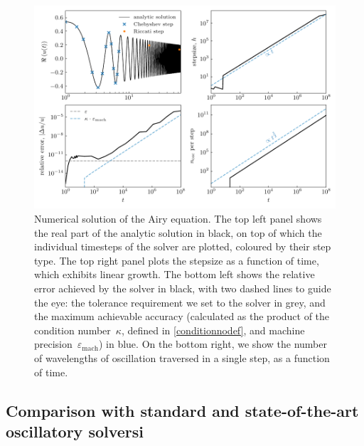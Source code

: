 \documentclass[10pt]{article}
\newcommand{\om}{\omega}
\begin{document}
\begin{figure}[tb]
    \centering
    \includegraphics{plots/airy-numsol.pdf}
    \caption{\label{airy-results} Numerical solution of the Airy equation. The
    top left panel shows the real part of the analytic solution in black, on
    top of which the individual timesteps of the solver are plotted, coloured
    by their step type. The top right panel plots the stepsize as a function of
    time, which exhibits linear growth. The bottom left shows the relative
    error achieved by the solver in black, with two dashed lines to guide the
    eye: the tolerance requirement we set to the solver in grey, and the
    maximum achievable accuracy (calculated as the product of the condition
    number~$\kappa$, defined in \cref{conditionnodef}, and machine precision~$\varepsilon_{\text{mach}}$) in blue. On the
    bottom right, we show the number of wavelengths of oscillation traversed in
    a single step, as a function of time. 
    }
\end{figure}


\subsection{Comparison with standard and state-of-the-art oscillatory solversi \label{solvercomp}}
\end{document}
